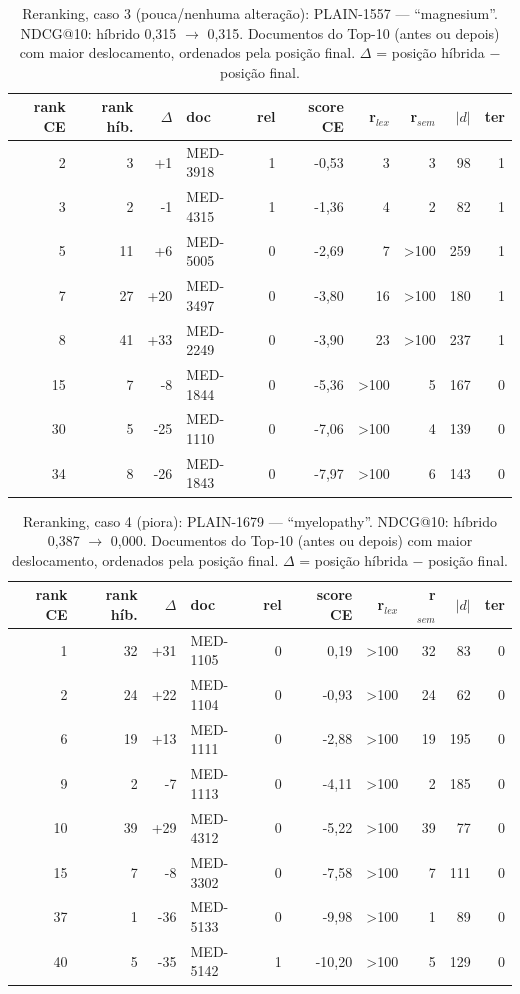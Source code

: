\begin{table}[!htb]
\centering
\caption{Reranking, caso 3 (pouca/nenhuma alteração): PLAIN-1557 --- ``magnesium''. NDCG@10: híbrido 0,315 $\rightarrow$ 0,315. Documentos do Top-10 (antes ou depois) com maior deslocamento, ordenados pela posição final. $\Delta$ = posição híbrida $-$ posição final.}
\label{tab:rr3}
\scriptsize
\begin{tabular}{rrrlrrrrrr}
\toprule
rank CE & rank híb. & $\Delta$ & doc & rel & score CE & r$_{lex}$ & r$_{sem}$ & $|d|$ & ter \\
\midrule
2 & 3 & +1 & MED-3918 & 1 & -0,53 & 3 & 3 & 98 & 1 \\
3 & 2 & -1 & MED-4315 & 1 & -1,36 & 4 & 2 & 82 & 1 \\
5 & 11 & +6 & MED-5005 & 0 & -2,69 & 7 & >100 & 259 & 1 \\
7 & 27 & +20 & MED-3497 & 0 & -3,80 & 16 & >100 & 180 & 1 \\
8 & 41 & +33 & MED-2249 & 0 & -3,90 & 23 & >100 & 237 & 1 \\
15 & 7 & -8 & MED-1844 & 0 & -5,36 & >100 & 5 & 167 & 0 \\
30 & 5 & -25 & MED-1110 & 0 & -7,06 & >100 & 4 & 139 & 0 \\
34 & 8 & -26 & MED-1843 & 0 & -7,97 & >100 & 6 & 143 & 0 \\
\bottomrule
\end{tabular}
\end{table}
\begin{table}[!htb]
\centering
\caption{Reranking, caso 4 (piora): PLAIN-1679 --- ``myelopathy''. NDCG@10: híbrido 0,387 $\rightarrow$ 0,000. Documentos do Top-10 (antes ou depois) com maior deslocamento, ordenados pela posição final. $\Delta$ = posição híbrida $-$ posição final.}
\label{tab:rr4}
\scriptsize
\begin{tabular}{rrrlrrrrrr}
\toprule
rank CE & rank híb. & $\Delta$ & doc & rel & score CE & r$_{lex}$ & r$_{sem}$ & $|d|$ & ter \\
\midrule
1 & 32 & +31 & MED-1105 & 0 & 0,19 & >100 & 32 & 83 & 0 \\
2 & 24 & +22 & MED-1104 & 0 & -0,93 & >100 & 24 & 62 & 0 \\
6 & 19 & +13 & MED-1111 & 0 & -2,88 & >100 & 19 & 195 & 0 \\
9 & 2 & -7 & MED-1113 & 0 & -4,11 & >100 & 2 & 185 & 0 \\
10 & 39 & +29 & MED-4312 & 0 & -5,22 & >100 & 39 & 77 & 0 \\
15 & 7 & -8 & MED-3302 & 0 & -7,58 & >100 & 7 & 111 & 0 \\
37 & 1 & -36 & MED-5133 & 0 & -9,98 & >100 & 1 & 89 & 0 \\
40 & 5 & -35 & MED-5142 & 1 & -10,20 & >100 & 5 & 129 & 0 \\
\bottomrule
\end{tabular}
\end{table}
